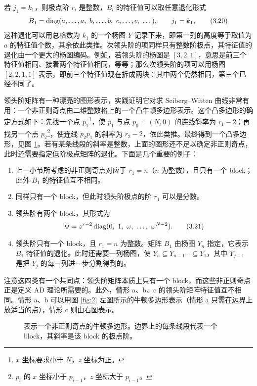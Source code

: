 若 $j_1 = k_1$，则极点阶 $r_i$ 是整数，$B_i$ 的特征值可以取任意退化形式
\begin{equation}
B_1 = \operatorname{diag}(a,\dots,a,\ b,\dots,b,\ c,\dots,c,\ \dots),\qquad j_1 = k_1,
\label{eq:3.20}\tag{3.20}
\end{equation}
这种退化可以用总格数为 $k_1$ 的一个杨图 $Y$ 记录下来，即第一列的高度等于取值为 $a$ 的特征值个数，其余依此类推。次领头阶的项同样只有整数阶极点，其特征值的退化由一个更大的杨图编码。例如，若领头阶的杨图是 $[3,2,1]$，意思是前三个特征值相同、接着两个特征值相同，等等；那么次领头阶的项可以用杨图 $[2,2,1,1]$ 表示，即前三个特征值现在拆成两块：其中两个仍然相同，第三个已经不同了。

领头阶矩阵有一种漂亮的图形表示，实践证明它对求 Seiberg--Witten 曲线非常有用：一个非正则奇点由二维整数格上的一个凸牛顿多边形表示。这个凸多边形的确定方式如下：先找一个点 $p_1$\footnote{$x$ 坐标要求小于 $N$，$z$ 坐标为正。}，使 $p_1$ 与点 $p_0 = (N,0)$ 的连线斜率为 $r_1-2$；再找另一个点 $p_2$\footnote{$p_i$ 的 $x$ 坐标小于 $p_{i-1}$，$z$ 坐标大于 $p_{i-1}$。}，使连线 $p_2p_1$ 的斜率为 $r_2-2$，依此类推。最终得到一个凸多边形，见图 \ref{fig:1}。若有某条线段的斜率是整数，上面的图形还不足以确定非正则奇点，此时还需要指定低阶极点矩阵的退化。下面是几个重要的例子：

\begin{enumerate}[label=\textup{\alph*.}]
  \item 上一小节所考虑的非正则奇点对应于 $r_1 = n$（$n$ 为整数），且只有一个 block；此外 $B_1$ 的特征值互不相同。
  \item 同样只有一个 block，但此时领头阶极点的阶 $r_1$ 可以是分数。
  \item 领头阶有两个 block，其形式为
  \begin{equation}
  \Phi = z^{r-2}\operatorname{diag}(0,\ 1,\ \omega,\ \dots,\ \omega^{N-2}).
  \label{eq:3.21}\tag{3.21}
  \end{equation}
  \item 领头阶只有一个 block，且 $r_1 = n$ 为整数。矩阵 $B_1$ 由杨图 $Y_n$ 指定，它表示 $B_1$ 特征值的退化。此时还需要一列杨图，使 $Y_n\subseteq Y_{n-1}\cdots\subseteq Y_1$，其中 $Y_{j-1}$ 是把 $Y_j$ 的每一列进一步分割得到的。
\end{enumerate}

注意这四类有一个共同点：领头阶矩阵本质上只有一个 block，而这些非正则奇点正是定义 AD 理论所需要的。此外，情形 a、b、c 的领头阶矩阵特征值互不相同。情形 a、b 可以用图 \ref{fig:2} 左图所示的牛顿多边形表示（情形 a 只需在边界上放适当的点），情形 c 则由右图表示。

\begin{figure}[tbp]
\centering

\caption{表示一个非正则奇点的牛顿多边形。边界上的每条线段代表一个 block，其斜率是该 block 的极点阶。}
\label{fig:1}
\end{figure}

